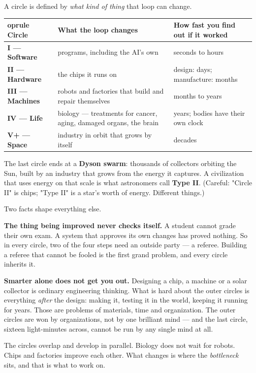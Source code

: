 \documentclass[11pt]{article}
\begin{document}
A circle is defined by \emph{what kind of thing} that loop can change.

\begin{center}\small\begin{tabularx}{\textwidth}{@{}p{2.6cm}XX@{}}	oprule Circle & What the loop changes & How fast you find out if it worked \\ \midrule
\textbf{I --- Software} & programs, including the AI's own & seconds to hours \\
\textbf{II --- Hardware} & the chips it runs on & design: days; manufacture: months \\
\textbf{III --- Machines} & robots and factories that build and repair themselves & months to years \\
\textbf{IV --- Life} & biology --- treatments for cancer, aging, damaged organs, the brain & years; bodies have their own clock \\
\textbf{V+ --- Space} & industry in orbit that grows by itself & decades \\
\bottomrule\end{tabularx}\end{center}

The last circle ends at a \textbf{Dyson swarm}: thousands of collectors orbiting the Sun, built by an industry that grows from the energy it captures. A civilization that uses energy on that scale is what astronomers call \textbf{Type II}. (Careful: "Circle II" is chips; "Type II" is a star's worth of energy. Different things.)

Two facts shape everything else.

\textbf{The thing being improved never checks itself.} A student cannot grade their own exam. A system that approves its own changes has proved nothing. So in every circle, two of the four steps need an outside party --- a referee. Building a referee that cannot be fooled is the first grand problem, and every circle inherits it.

\textbf{Smarter alone does not get you out.} Designing a chip, a machine or a solar collector is ordinary engineering thinking. What is hard about the outer circles is everything \emph{after} the design: making it, testing it in the world, keeping it running for years. Those are problems of materials, time and organization. The outer circles are won by organizations, not by one brilliant mind --- and the last circle, sixteen light-minutes across, cannot be run by any single mind at all.

The circles overlap and develop in parallel. Biology does not wait for robots. Chips and factories improve each other. What changes is where the \emph{bottleneck} sits, and that is what to work on.
\end{document}
